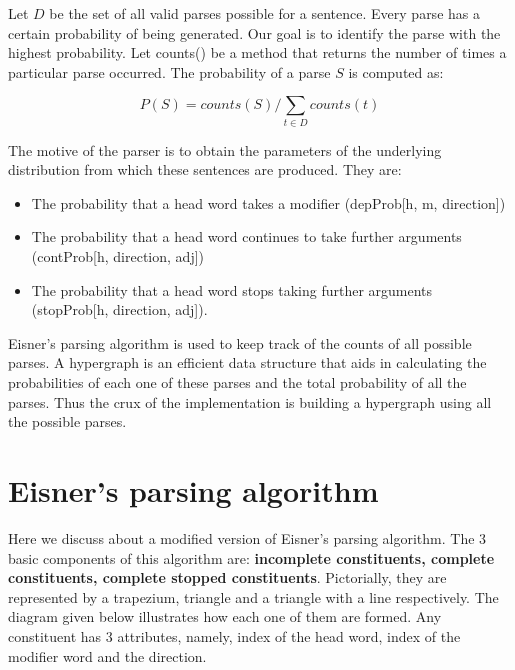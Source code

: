 \documentclass{book}
\begin{document}
 Let $D$ be the set of all valid parses possible for a sentence. Every parse has a certain probability of being generated. Our goal is to identify the parse with the highest probability. Let counts() be a method that returns the number of times a particular parse occurred. The probability of a parse $S$ is computed as:

            $$P(S) = counts(S) / \sum_{t \in D} counts(t) $$

The motive of the parser is to obtain the parameters of the underlying distribution from which these sentences are produced. They are: 

\begin{itemize}
\item The probability that a head word takes a modifier (depProb[h, m, direction])
\item The probability that a head word continues to take further arguments (contProb[h, direction, adj])
\item The probability that a head word stops taking further arguments (stopProb[h, direction, adj]).
\end{itemize}


Eisner's parsing algorithm is used to keep track of the counts of all possible parses. A hypergraph is an efficient data structure that aids in calculating the probabilities of each one of these parses and the total probability of all the parses. Thus the crux of the implementation is building a hypergraph using all the possible parses.

\section{Eisner's parsing algorithm}

Here we discuss about a modified version of Eisner's parsing algorithm. The 3 basic components of this algorithm are: \textbf{incomplete constituents, complete constituents, complete stopped constituents}. Pictorially, they are represented by a trapezium, triangle and a triangle with a line respectively. The diagram given below illustrates how each one of them are formed. Any constituent has  3 attributes, namely, index of the head word, index of the modifier word and the direction. 
\end{document}
